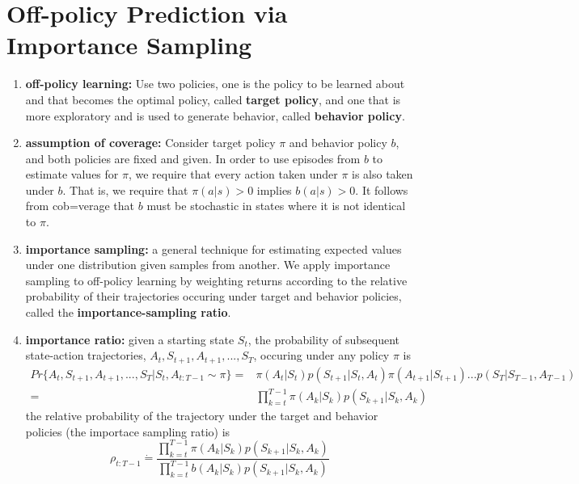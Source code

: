 \section{Off-policy Prediction via Importance Sampling}
\begin{enumerate}
	\item \textbf{off-policy learning:} Use two policies, one is the policy to be learned about and that becomes the optimal policy, called \textbf{target policy}, and one that is more exploratory and is used to generate behavior, called \textbf{behavior policy}.

	\item \textbf{assumption of coverage:} Consider target policy $\pi$ and behavior policy $b$, and both policies are fixed and given. In order to use episodes from $b$ to estimate values for $\pi$, we require that every action taken under $\pi$ is also taken under $b$. That is, we require that $\pi(a|s) > 0$ implies $b(a|s)>0$. It follows from cob=verage that $b$ must be stochastic in states where it is not identical to $\pi$.

	\item \textbf{importance sampling:} a general technique for estimating expected values under one distribution given samples from another. We apply importance sampling to off-policy learning by weighting returns according to the relative probability of their trajectories occuring under target and behavior policies, called the \textbf{importance-sampling ratio}.

	\item \textbf{importance ratio:} given a starting state $S_t$, the probability of subsequent state-action trajectories, $A_t, S_{t+1}, A_{t+1},...,S_T$, occuring under any policy $\pi$ is 
	\begin{equation}
	\begin{split}
	Pr\{A_t, S_{t+1}, A_{t+1},...,S_T|S_t, A_{t:T-1}\sim \pi\} =& \pi(A_t|S_t)p(S_{t+1}|S_t, A_t)\pi(A_{t+1}|S_{t+1})...p(S_T|S_{T-1}, A_{T-1}) \\
	= &\prod_{k=t}^{T-1}\pi(A_k|S_k)p(S_{k+1}|S_k, A_k)
	\end{split}
	\end{equation}
	the relative probability of the trajectory under the target and behavior policies (the importace sampling ratio) is 
	\begin{equation}
	\rho_{t:T-1} \dot{=} \frac{\prod_{k=t}^{T-1}\pi(A_k|S_k)p(S_{k+1}|S_k,A_k)}{\prod_{k=t}^{T-1}b(A_k|S_k)p(S_{k+1}|S_k,A_k)}
	\end{equation}


\end{enumerate}
